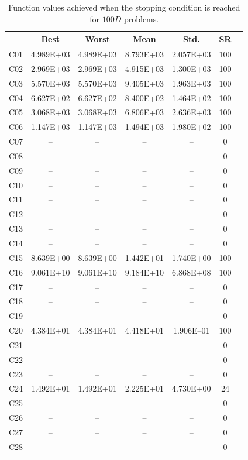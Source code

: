 \documentclass[conference]{IEEEtran}
\begin{document}
% 
% 
% 
\begin{table}[!ht]
	\caption{Function values achieved when the stopping condition is reached for $100D$ problems.}
	\centering
	\begin{tabular}{|c|c|c|c|c|c|c|}
	\hline
     & Best & Worst & Mean & Std. & SR \\ \hline \hline
C01 & 4.989E+03 & 4.989E+03 & 8.793E+03 & 2.057E+03 &  100 \\ 
C02 & 2.969E+03 & 2.969E+03 & 4.915E+03 & 1.300E+03 &  100 \\ 
C03 & 5.570E+03 & 5.570E+03 & 9.405E+03 & 1.963E+03 &  100 \\ 
C04 & 6.627E+02 & 6.627E+02 & 8.400E+02 & 1.464E+02 &  100 \\ 
C05 & 3.068E+03 & 3.068E+03 & 6.806E+03 & 2.636E+03 &  100 \\ 
C06 & 1.147E+03 & 1.147E+03 & 1.494E+03 & 1.980E+02 &  100 \\ 
C07 &  -- &  -- &  -- &  -- &    0 \\ 
C08 &  -- &  -- &  -- &  -- &    0 \\ 
C09 &  -- &  -- &  -- &  -- &    0 \\ 
C10 &  -- &  -- &  -- &  -- &    0 \\ 
C11 &  -- &  -- &  -- &  -- &    0 \\ 
C12 &  -- &  -- &  -- &  -- &    0 \\ 
C13 &  -- &  -- &  -- &  -- &    0 \\ 
C14 &  -- &  -- &  -- &  -- &    0 \\ 
C15 & 8.639E+00 & 8.639E+00 & 1.442E+01 & 1.740E+00 &  100 \\ 
C16 & 9.061E+10 & 9.061E+10 & 9.184E+10 & 6.868E+08 &  100 \\ 
C17 &  -- &  -- &  -- &  -- &    0 \\ 
C18 &  -- &  -- &  -- &  -- &    0 \\ 
C19 &  -- &  -- &  -- &  -- &    0 \\ 
C20 & 4.384E+01 & 4.384E+01 & 4.418E+01 & 1.906E--01 &  100 \\ 
C21 &  -- &  -- &  -- &  -- &    0 \\ 
C22 &  -- &  -- &  -- &  -- &    0 \\ 
C23 &  -- &  -- &  -- &  -- &    0 \\ 
C24 & 1.492E+01 & 1.492E+01 & 2.225E+01 & 4.730E+00 &   24 \\ 
C25 &  -- &  -- &  -- &  -- &    0 \\ 
C26 &  -- &  -- &  -- &  -- &    0 \\ 
C27 &  -- &  -- &  -- &  -- &    0 \\ 
C28 &  -- &  -- &  -- &  -- &    0 \\ 
\hline
	\end{tabular}
	\label{tab:d100}
\end{table}
\end{document}

